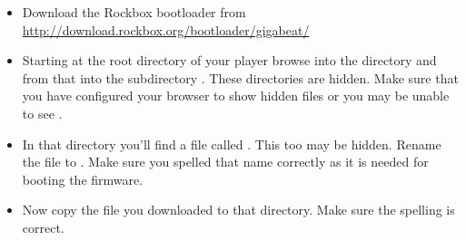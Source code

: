 
\begin{itemize}
\item Download the Rockbox bootloader from
  \url{http://download.rockbox.org/bootloader/gigabeat/}
\item Starting at the root directory of your player browse into the directory
   and from that into the subdirectory .
  These directories are hidden. Make sure that you have configured your browser
  to show hidden files or you may be unable to see .
\item In that directory you'll find a file called . This too
  may be hidden. Rename the file to . Make sure you
  spelled that name  correctly as it is needed for booting the \playerman{} firmware.
\item Now copy the file  you downloaded to that directory.
  Make sure the spelling is correct.
\end{itemize}